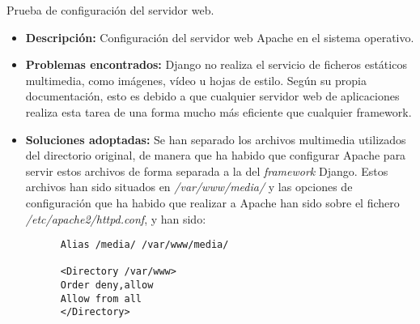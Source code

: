 \item Prueba de configuración del servidor web.
  \begin{itemize}
    \item \textbf{Descripción:} Configuración del servidor web Apache en el
    sistema operativo.
    \item \textbf{Problemas encontrados:} Django no realiza el servicio de
    ficheros estáticos multimedia, como imágenes, vídeo u hojas de estilo.
    Según su propia documentación, esto es debido a que cualquier servidor web
    de aplicaciones realiza esta tarea de una forma mucho más eficiente que
    cualquier framework.
    \item \textbf{Soluciones adoptadas:} Se han separado los archivos multimedia
    utilizados del directorio original, de manera que ha habido que configurar
    Apache para servir estos archivos de forma separada a la del
    \textit{framework} Django. Estos archivos han sido situados en
    \textit{/var/www/media/} y las opciones de configuración que ha habido que
    realizar a Apache han sido sobre el fichero
    \textit{/etc/apache2/httpd.conf}, y han sido:

    \begin{verbatim}
      Alias /media/ /var/www/media/

      <Directory /var/www>
      Order deny,allow
      Allow from all
      </Directory>
    \end{verbatim}

  \end{itemize}

